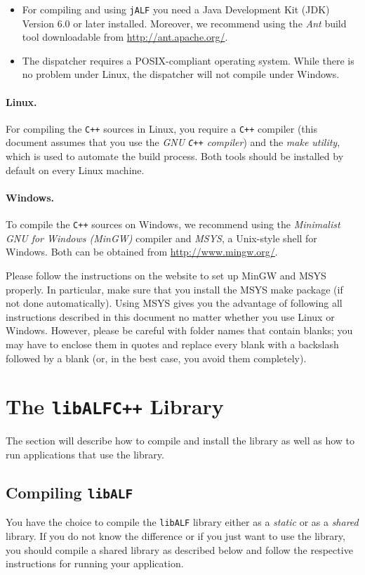 \documentclass[a4paper, fontsize=11pt, DIV=12, parskip=half]{scrartcl}
\newcommand{\libalf}{\texttt{libALF}\xspace}
\newcommand{\jalf}{\texttt{jALF}\xspace}
\newcommand{\cpp}{\texttt{C+$\!$+}\xspace}
\begin{document}
\begin{itemize}
  \item For compiling and using \jalf you need a Java Development Kit (JDK) Version 6.0 or later installed. Moreover, we recommend using the \emph{Ant} build tool downloadable from \url{http://ant.apache.org/}.
  \item The dispatcher requires a POSIX-compliant operating system. While there is no problem under Linux, the dispatcher will not compile under Windows.
\end{itemize}

\paragraph{Linux.}
For compiling the \cpp sources in Linux, you require a \cpp compiler (this document assumes that you use the \emph{GNU \cpp compiler}) and the \emph{make utility}, which is used to automate the build process. Both tools should be installed by default on every Linux machine.

\paragraph{Windows.}
To compile the \cpp sources on Windows, we recommend using the \emph{Minimalist GNU for Windows (MinGW)} compiler and \emph{MSYS}, a Unix-style shell for Windows. Both can be obtained from \url{http://www.mingw.org/}. 

Please follow the instructions on the website to set up MinGW and MSYS properly. In particular, make sure that you install the MSYS make package (if not done automatically). Using MSYS gives you the advantage of following all instructions described in this document no matter whether you use Linux or Windows. However, please be careful with folder names that contain blanks; you may have to enclose them in quotes and replace every blank with a backslash followed by a blank (or, in the best case, you avoid them completely).

\section{\texorpdfstring{The \libalf \cpp Library}{The libALF C++ Library}}\label{sec:libalf}
The section will describe how to compile and install the library as well as how to run applications that use the library.

\subsection{Compiling \libalf}
You have the choice to compile the \libalf library either as a \emph{static} or as a \emph{shared} library. If you do not know the difference or if you just want to use the library, you should compile a shared library as described below and follow the respective instructions for running your application.
\end{document}
